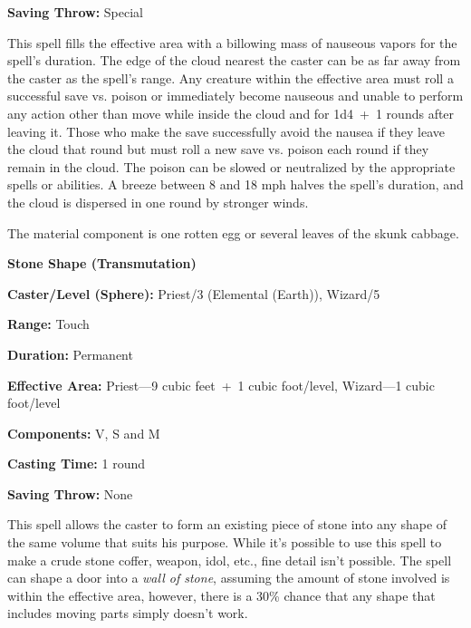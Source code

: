 \begin{multicols}{2}
\begin{minipage}{\columnwidth}
\noindent \textbf{Saving Throw:} Special

\end{minipage}

This spell fills the effective area with a billowing mass of nauseous vapors for the spell's duration.  The edge of the cloud nearest the caster can be as far away from the caster as the spell's range.  Any creature within the effective area must roll a successful save vs. poison or immediately become nauseous and unable to perform any action other than move while inside the cloud and for 1d4~+~1 rounds after leaving it.  Those who make the save successfully avoid the nausea if they leave the cloud that round but must roll a new save vs. poison each round if they remain in the cloud.  The poison can be slowed or neutralized by the appropriate spells or abilities.  A breeze between 8 and 18 mph halves the spell's duration, and the cloud is dispersed in one round by stronger winds.

The material component is one rotten egg or several leaves of the skunk cabbage.

\vspace{1em}

\noindent
\begin{minipage}{\columnwidth}

\noindent \textbf{Stone Shape (Transmutation)}

\noindent \textbf{Caster/Level (Sphere):} Priest/3 (Elemental (Earth)), Wizard/5

\noindent \textbf{Range:} Touch

\noindent \textbf{Duration:} Permanent

\noindent \textbf{Effective Area:} Priest---9 cubic feet~+~1 cubic foot/level, Wizard---1 cubic foot/level

\noindent \textbf{Components:} V, S and M

\noindent \textbf{Casting Time:} 1 round

\noindent \textbf{Saving Throw:} None

\end{minipage}

This spell allows the caster to form an existing piece of stone into any shape of the same volume that suits his purpose.  While it's possible to use this spell to make a crude stone coffer, weapon, idol, etc., fine detail isn't possible.  The spell can shape a door into a \textit{wall of stone}, assuming the amount of stone involved is within the effective area, however, there is a 30\% chance that any shape that includes moving parts simply doesn't work. 


\end{multicols}
